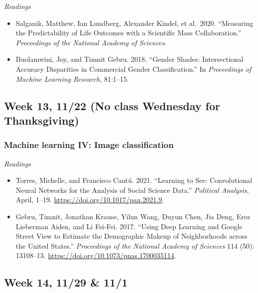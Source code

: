 \documentclass[
  10pt,
]{article}
\providecommand{\tightlist}{%
  \setlength{\itemsep}{0pt}\setlength{\parskip}{0pt}}
\begin{document}
\emph{Readings}

\begin{itemize}
\tightlist
\item
  Salganik, Matthew, Ian Lundberg, Alexander Kindel, et al.~2020.
  ``Measuring the Predictability of Life Outcomes with a Scientiﬁc Mass
  Collaboration.'' \emph{Proceedings of the National Academy of
  Sciences}.
\item
  Buolamwini, Joy, and Timnit Gebru. 2018. ``Gender Shades:
  Intersectional Accuracy Disparities in Commercial Gender
  Classiﬁcation.'' In \emph{Proceedings of Machine Learning Research},
  81:1--15.
\end{itemize}

\hypertarget{week-13-1122-no-class-wednesday-for-thanksgiving}{%
\subsection{Week 13, 11/22 (No class Wednesday for
Thanksgiving)}\label{week-13-1122-no-class-wednesday-for-thanksgiving}}

\hypertarget{machine-learning-iv-image-classification}{%
\subsubsection{Machine learning IV: Image
classification}\label{machine-learning-iv-image-classification}}

\emph{Readings}

\begin{itemize}
\tightlist
\item
  Torres, Michelle, and Francisco Cantú. 2021. ``Learning to See:
  Convolutional Neural Networks for the Analysis of Social Science
  Data.'' \emph{Political Analysis}, April, 1--19.
  \url{https://doi.org/10.1017/pan.2021.9}.
\item
  Gebru, Timnit, Jonathan Krause, Yilun Wang, Duyun Chen, Jia Deng, Erez
  Lieberman Aiden, and Li Fei-Fei. 2017. ``Using Deep Learning and
  Google Street View to Estimate the Demographic Makeup of Neighborhoods
  across the United States.'' \emph{Proceedings of the National Academy
  of Sciences} 114 (50): 13108--13.
  \url{https://doi.org/10.1073/pnas.1700035114}.
\end{itemize}

\hypertarget{week-14-1129-111}{%
\subsection{Week 14, 11/29 \& 11/1}\label{week-14-1129-111}}
\end{document}
